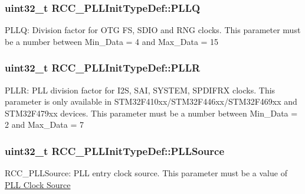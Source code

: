 \subsubsection[{\texorpdfstring{P\+L\+LQ}{PLLQ}}]{\setlength{\rightskip}{0pt plus 5cm}uint32\+\_\+t R\+C\+C\+\_\+\+P\+L\+L\+Init\+Type\+Def\+::\+P\+L\+LQ}\hypertarget{struct_r_c_c___p_l_l_init_type_def_a2b69dfec4b8ab52d649a71d141892691}{}\label{struct_r_c_c___p_l_l_init_type_def_a2b69dfec4b8ab52d649a71d141892691}
P\+L\+LQ\+: Division factor for O\+TG FS, S\+D\+IO and R\+NG clocks. This parameter must be a number between Min\+\_\+\+Data = 4 and Max\+\_\+\+Data = 15 
\subsubsection[{\texorpdfstring{P\+L\+LR}{PLLR}}]{\setlength{\rightskip}{0pt plus 5cm}uint32\+\_\+t R\+C\+C\+\_\+\+P\+L\+L\+Init\+Type\+Def\+::\+P\+L\+LR}\hypertarget{struct_r_c_c___p_l_l_init_type_def_a41208d1f84fc268f14fed2c825d07fbc}{}\label{struct_r_c_c___p_l_l_init_type_def_a41208d1f84fc268f14fed2c825d07fbc}
P\+L\+LR\+: P\+LL division factor for I2S, S\+AI, S\+Y\+S\+T\+EM, S\+P\+D\+I\+F\+RX clocks. This parameter is only available in S\+T\+M32\+F410xx/\+S\+T\+M32\+F446xx/\+S\+T\+M32\+F469xx and S\+T\+M32\+F479xx devices. This parameter must be a number between Min\+\_\+\+Data = 2 and Max\+\_\+\+Data = 7 
\subsubsection[{\texorpdfstring{P\+L\+L\+Source}{PLLSource}}]{\setlength{\rightskip}{0pt plus 5cm}uint32\+\_\+t R\+C\+C\+\_\+\+P\+L\+L\+Init\+Type\+Def\+::\+P\+L\+L\+Source}\hypertarget{struct_r_c_c___p_l_l_init_type_def_a72806832a179af8756b9330de7f7c6a8}{}\label{struct_r_c_c___p_l_l_init_type_def_a72806832a179af8756b9330de7f7c6a8}
R\+C\+C\+\_\+\+P\+L\+L\+Source\+: P\+LL entry clock source. This parameter must be a value of \hyperlink{group___r_c_c___p_l_l___clock___source}{P\+LL Clock Source} 
